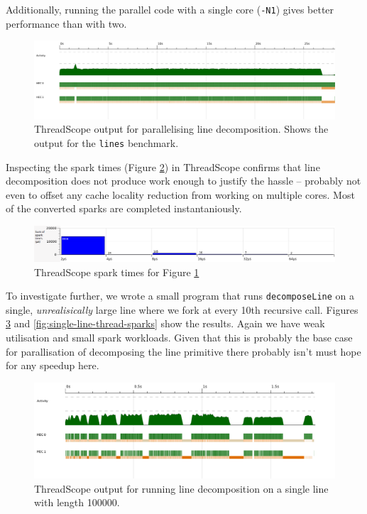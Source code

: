 \documentclass[12pt, a4paper]{article}
\begin{document}
Additionally, running the parallel code with a single core (\texttt{-N1}) gives better performance than with
two.
\begin{figure}[h!]
  \centering
  \includegraphics[width=0.85\linewidth]{../threadscope/lines/single-split}
  \caption{ThreadScope output for parallelising line decomposition. Shows the output for the
    \texttt{lines} benchmark.}
  \label{fig:line-thread}
\end{figure}

Inspecting the spark times (Figure \ref{fig:line-thread-sparks}) in ThreadScope confirms that line
decomposition does not produce work enough to justify the hassle --
probably not even to offset any cache locality reduction from working 
on multiple cores. Most of the converted sparks are completed instantaniously.

\begin{figure}[h!]
  \centering
  \includegraphics[width=0.85\linewidth]{../threadscope/lines/single-split-spark-times}
  \caption{ThreadScope spark times for Figure \ref{fig:line-thread}}
  \label{fig:line-thread-sparks}
\end{figure}

To investigate further, we wrote a small program that runs \texttt{decomposeLine} on a single, \textit{unrealisically} large line where
 we fork at every 10th recursive call. Figures \ref{fig:single-line-thread} and \ref{fig:single-line-thread-sparks} show the results. Again we have
 weak utilisation and small spark workloads. Given that this is probably the base case for parallisation of decomposing the line primitive there
  probably isn't must hope for any speedup here.

\begin{figure}[h!]
  \centering
  \includegraphics[width=0.85\linewidth]{../threadscope/lines/single-line-every-10}
  \caption{ThreadScope output for running line decomposition on a single line with length
    100000.}
  \label{fig:single-line-thread}
\end{figure}
\end{document}
